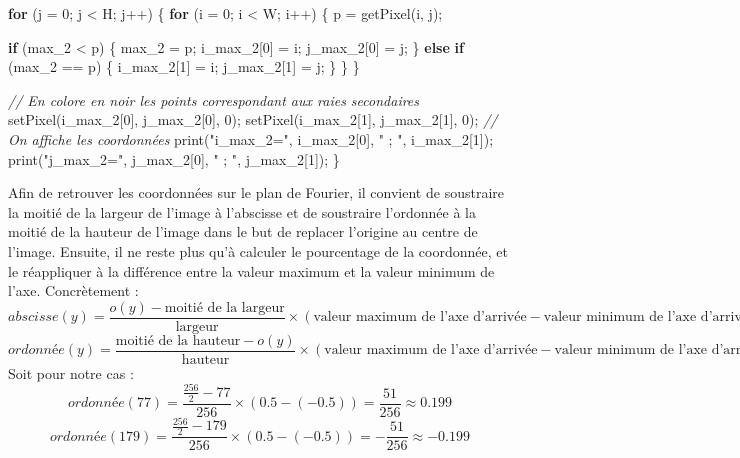 \documentclass[french,]{article}
\newenvironment{Shaded}{}{}
\newcommand{\KeywordTok}[1]{\textcolor[rgb]{0.00,0.44,0.13}{\textbf{{#1}}}}
\newcommand{\DecValTok}[1]{\textcolor[rgb]{0.25,0.63,0.44}{{#1}}}
\newcommand{\StringTok}[1]{\textcolor[rgb]{0.25,0.44,0.63}{{#1}}}
\newcommand{\CommentTok}[1]{\textcolor[rgb]{0.38,0.63,0.69}{\textit{{#1}}}}
\newcommand{\FunctionTok}[1]{\textcolor[rgb]{0.02,0.16,0.49}{{#1}}}
\newcommand{\NormalTok}[1]{{#1}}
\begin{document}
\begin{Shaded}
\begin{Highlighting}[]
    \KeywordTok{for} \NormalTok{(j = }\DecValTok{0}\NormalTok{; j < H; j++) \{}
        \KeywordTok{for} \NormalTok{(i = }\DecValTok{0}\NormalTok{; i < W; i++) \{}
            \NormalTok{p = }\FunctionTok{getPixel}\NormalTok{(i, j);}
            
            \KeywordTok{if} \NormalTok{(max_2 < p) \{}
                \NormalTok{max_2 = p;}
                \NormalTok{i_max_2[}\DecValTok{0}\NormalTok{] = i;}
                \NormalTok{j_max_2[}\DecValTok{0}\NormalTok{] = j;}
            \NormalTok{\} }\KeywordTok{else} \KeywordTok{if} \NormalTok{(max_2 == p) \{}
                \NormalTok{i_max_2[}\DecValTok{1}\NormalTok{] = i;}
                \NormalTok{j_max_2[}\DecValTok{1}\NormalTok{] = j;}
            \NormalTok{\}}
        \NormalTok{\}}
    \NormalTok{\}}

    \CommentTok{// En colore en noir les points correspondant aux raies secondaires}
    \FunctionTok{setPixel}\NormalTok{(i_max_2[}\DecValTok{0}\NormalTok{],  j_max_2[}\DecValTok{0}\NormalTok{], }\DecValTok{0}\NormalTok{);}
    \FunctionTok{setPixel}\NormalTok{(i_max_2[}\DecValTok{1}\NormalTok{],  j_max_2[}\DecValTok{1}\NormalTok{], }\DecValTok{0}\NormalTok{);}
    \CommentTok{// On affiche les coordonnées}
    \FunctionTok{print}\NormalTok{(}\StringTok{"i_max_2="}\NormalTok{, i_max_2[}\DecValTok{0}\NormalTok{], }\StringTok{" ; "}\NormalTok{, i_max_2[}\DecValTok{1}\NormalTok{]);}
    \FunctionTok{print}\NormalTok{(}\StringTok{"j_max_2="}\NormalTok{, j_max_2[}\DecValTok{0}\NormalTok{], }\StringTok{" ; "}\NormalTok{, j_max_2[}\DecValTok{1}\NormalTok{]);}
\NormalTok{\}}
\end{Highlighting}
\end{Shaded}

Afin de retrouver les coordonnées sur le plan de Fourier, il convient de
soustraire la moitié de la largeur de l'image à l'abscisse et de
soustraire l'ordonnée à la moitié de la hauteur de l'image dans le but
de replacer l'origine au centre de l'image. Ensuite, il ne reste plus
qu'à calculer le pourcentage de la coordonnée, et le réappliquer à la
différence entre la valeur maximum et la valeur minimum de l'axe.
Concrètement :
\[abscisse(y) = \frac{o(y) - \text{moitié de la largeur} } {\text{largeur}} \times (\text{valeur maximum de l’axe d’arrivée} - \text{valeur minimum de l’axe d’arrivée})\]
\[ordonnée(y) = \frac{\text{moitié de la hauteur} - o(y)} {\text{hauteur}} \times (\text{valeur maximum de l’axe d’arrivée} - \text{valeur minimum de l’axe d’arrivée})\]
Soit pour notre cas :
\[ordonnée(77) = \frac{\frac{256} {2} - 77} {256} \times (0.5 - (-0.5)) = \frac{51} {256} \approx 0.199\]
\[ordonnée(179) = \frac{\frac{256} {2} - 179} {256} \times (0.5 - (-0.5)) = -\frac{51} {256} \approx -0.199\]
\end{document}
